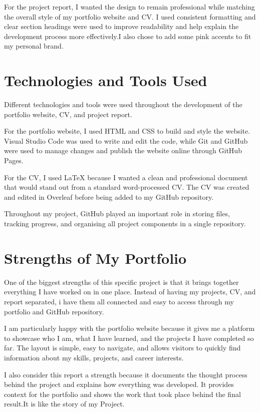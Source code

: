\documentclass[12pt,a4paper]{article}
\begin{document}
For the project report, I wanted the design to remain professional while matching the overall style of my portfolio website and CV. I used consistent formatting and clear section headings were used to improve readability and help explain the development process more effectively.I also chose to add some pink accents to fit my personal brand.


\section{Technologies and Tools Used}

Different technologies and tools were used throughout the development of the portfolio website, CV, and project report.

For the portfolio website, I used HTML and CSS to build and style the website. Visual Studio Code was used to write and edit the code, while Git and GitHub were used to manage changes and publish the website online through GitHub Pages.

For the CV, I used LaTeX because I wanted a clean and professional document that would stand out from a standard word-processed CV. The CV was created and edited in Overleaf before being added to my GitHub repository.

Throughout my project, GitHub played an important role in storing files, tracking progress, and organising all project components in a single repository. 

\section{Strengths of My Portfolio}

One of the biggest strengths of this specific project is that it brings together everything I have worked on in one place. Instead of having my projects, CV, and report separated, i have them all connected and easy to access through my portfolio and GitHub repository.

I am particularly happy with the portfolio website because it gives me a platform to showcase who I am, what I have learned, and the projects I have completed so far. The layout is simple, easy to navigate, and allows visitors to quickly find information about my skills, projects, and career interests.


I also consider this report a strength because it documents the thought process behind the project and explains how everything was developed. It provides context for the portfolio and shows the work that took place behind the final result.It is like the story of my Project.
\end{document}
